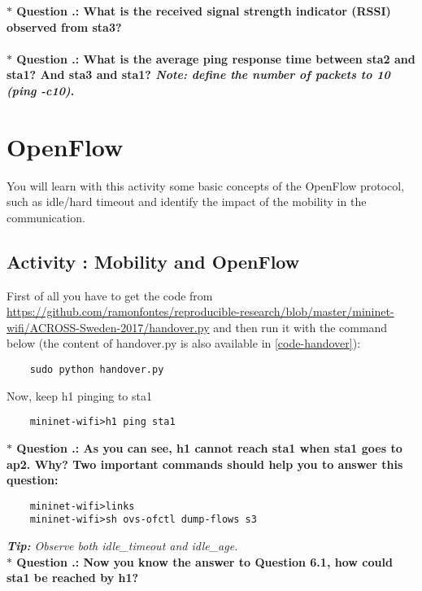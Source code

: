\noindent \textbf{$\ast$ Question \themycounter.\thequestion{}: What is the received signal strength indicator (RSSI) observed from sta3?}
\\
\\
\noindent \textbf{$\ast$ Question \themycounter.\thequestion{}: What is the average ping response time between sta2 and sta1? And sta3 and sta1? \textit{Note: define the number of packets to 10 (ping -c10)}.}


\section{OpenFlow}
You will learn with this activity some basic concepts of the OpenFlow protocol, such as idle/hard timeout and identify the impact of the mobility in the communication. 

\setcounter{question}{1}
\subsection{Activity \themycounter{}: Mobility and OpenFlow}

\noindent First of all you have to get the code from \url{https://github.com/ramonfontes/reproducible-research/blob/master/mininet-wifi/ACROSS-Sweden-2017/handover.py} and then run it with the command below (the content of handover.py is also available in \autoref{code-handover}):

\begin{verbatim}
    sudo python handover.py
\end{verbatim}

\noindent Now, keep h1 pinging to sta1
\begin{verbatim}
    mininet-wifi>h1 ping sta1
\end{verbatim}

\noindent \textbf{$\ast$ Question \themycounter.\thequestion{}: As you can see, h1 cannot reach sta1 when sta1 goes to ap2. Why? Two important commands should help you to answer this question:}

\begin{verbatim}
    mininet-wifi>links 
    mininet-wifi>sh ovs-ofctl dump-flows s3 
\end{verbatim}
\textit{\textbf{Tip:} Observe both idle\_timeout and idle\_age.}\\

\noindent \textbf{$\ast$ Question \themycounter.\thequestion{}: Now you know the answer to Question 6.1, how could sta1 be reached by h1?}